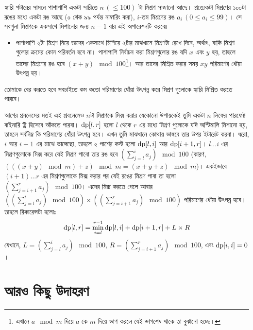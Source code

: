 \begin{example}
  হ্যারি পটারের সামনে পাশাপাশি একটা সারিতে $n \, (\le 100)$ টা মিশ্রণ সাজানো
  আছে। প্রত্যেকটা মিশ্রণের ১০০টা রঙের মধ্যে একটা রঙ আছে (০ থেক ৯৯ পর্যন্ত
  নাম্বারিং করা), $i$-তম মিশ্রণের রঙ $a_i \, (0 \le a_i \le 99)$। সে সবগুলা
  মিশ্রণকে একসাথে মিশানোর জন্য $n-1$ বার এই অপারেশনটি করবেঃ
  \begin{itemize}
    \item পাশাপাশি ২টা মিশ্রণ নিয়ে তাদের একসাথে মিশিয়ে ২টার মাঝখানে মিশ্রণটা
    রেখে দিবে, অর্থাৎ, বাকি মিশ্রণ গুলোর ক্রমের কোন পরিবর্তন হবে না। পাশাপাশি
    নির্বাচন করা মিশ্রণগুলোর রঙ যদি $x$ এবং $y$ হয়, তাহলে তাদের মিশ্রণের রঙ
    হবে $(x+y) \mod 100$\footnote{এখানে $a \mod m$ দিয়ে $a$ কে $m$ দিয়ে ভাগ
    করলে যেই ভাগশেষ থাকে তা বুঝানো হচ্ছে।}। আর তাদের মিশ্রিত করার সময় $xy$
    পরিমাণের ধোঁয়া উৎপন্ন হয়।
  \end{itemize}
  তোমাকে বের করতে হবে সবচাইতে কম কতো পরিমাণের ধোঁয়া উৎপন্ন করে মিশ্রণ গুলোকে
  হ্যারি মিশ্রিত করতে পারবে।
\end{example}

\begin{solution}
  আগের প্রবলেমের মতই এই প্রবলেমেও $n$টা মিশ্রণকে মিক্স করার যেকোনো উপায়কেই
  তুমি একটা $n$ লিফের পারফেক্ট বাইনারি ট্রি হিসেবে আঁকতে পারবা।
  $\text{dp}[l, r]$ হলো $l$ থেকে $r$ এর মধ্যে মিশ্রণ গুলোকে যদি অপ্টিমালি
  মিশানো হয়, তাহলে সর্বনিম্ন কি পরিমাণের ধোঁয়া উৎপন্ন হবে। এখন তুমি মাঝখানে
  কোথায় ভাঙ্গবে তার উপর ইটারেট করবা। ধরো, $i$ আর $i+1$ এর মাঝে ভাঙ্গেছো,
  তাহলে ২ পাশের কস্ট হলো $\text{dp}[l, i]$ আর $\text{dp}[i+1, r]$। $l \ldots i$
  এর মিশ্রণগুলোকে মিক্স করে যেই মিশ্রণ পাবো তার রঙ হবে $\left(\sum_{j=l}^{i}
  a_j \right) \mod 100$ (কারণ, $(((x+y)\mod m) + z) \mod m = (x+y+z) \mod
  m$)। একইভাবে $(i+1) \ldots r$ এর মিশ্রণগুলোকে মিক্স করার পর যেই রঙের মিশ্রণ
  পাবা তা হলো $\left(\sum_{j=i+1}^{r} a_j \right) \mod 100$। এদের মিক্স করতে
  গেলে আবার $\left( \left(\sum_{j=l}^{i} a_j \right) \mod 100 \right) \times
  \left( \left( \sum_{j=i+1}^{r} a_j \right) \mod 100 \right)$ পরিমাণের ধোঁয়া
  উৎপন্ন হবে। তাহলে রিকারেন্সটা হলোঃ
  \[
    \text{dp}[l, r] = \min_{i=l}^{r-1} \text{dp}[l, i] + \text{dp}[i+1, r] + L
    \times R
  \]
  যেখানে, $L = \left(\sum_{j=l}^{i} a_j \right) \mod 100$, $R = \left(
  \sum_{j=i+1}^{r} a_j \right) \mod 100$, এবং $\text{dp}[i, i] = 0$।
\end{solution}

\section{আরও কিছু উদাহরণ}

